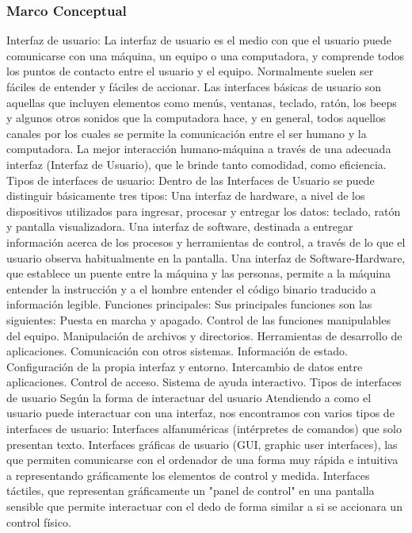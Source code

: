    \subsubsection{Marco Conceptual}
    Interfaz de usuario: La interfaz de usuario es el medio con que el usuario puede comunicarse con una máquina, un equipo o una computadora, y comprende todos los puntos de contacto entre el usuario y el equipo. Normalmente suelen ser fáciles de entender y fáciles de accionar. Las interfaces básicas de usuario son aquellas que incluyen elementos como menús, ventanas, teclado, ratón, los beeps y algunos otros sonidos que la computadora hace, y en general, todos aquellos canales por los cuales se permite la comunicación entre el ser humano y la computadora. La mejor interacción humano-máquina a través de una adecuada interfaz (Interfaz de Usuario), que le brinde tanto comodidad, como eficiencia.
    Tipos de interfaces de usuario: Dentro de las Interfaces de Usuario se puede distinguir básicamente tres tipos:
    Una interfaz de hardware, a nivel de los dispositivos utilizados para ingresar, procesar y entregar los datos: teclado, ratón y pantalla visualizadora.
    Una interfaz de software, destinada a entregar información acerca de los procesos y herramientas de control, a través de lo que el usuario observa habitualmente en la pantalla.
    Una interfaz de Software-Hardware, que establece un puente entre la máquina y las personas, permite a la máquina entender la instrucción y a el hombre entender el código binario traducido a información legible.
    Funciones principales: Sus principales funciones son las siguientes:
    Puesta en marcha y apagado.
    Control de las funciones manipulables del equipo.
    Manipulación de archivos y directorios.
    Herramientas de desarrollo de aplicaciones.
    Comunicación con otros sistemas.
    Información de estado.
    Configuración de la propia interfaz y entorno.
    Intercambio de datos entre aplicaciones.
    Control de acceso.
    Sistema de ayuda interactivo.
    Tipos de interfaces de usuario
    Según la forma de interactuar del usuario
    Atendiendo a como el usuario puede interactuar con una interfaz, nos encontramos con varios tipos de interfaces de usuario:
    Interfaces alfanuméricas (intérpretes de comandos) que solo presentan texto.
    Interfaces gráficas de usuario (GUI, graphic user interfaces), las que permiten comunicarse con el ordenador de una forma muy rápida e intuitiva a representando gráficamente los elementos de control y medida.
    Interfaces táctiles, que representan gráficamente un "panel de control" en una pantalla sensible que permite interactuar con el dedo de forma similar a si se accionara un control físico.
